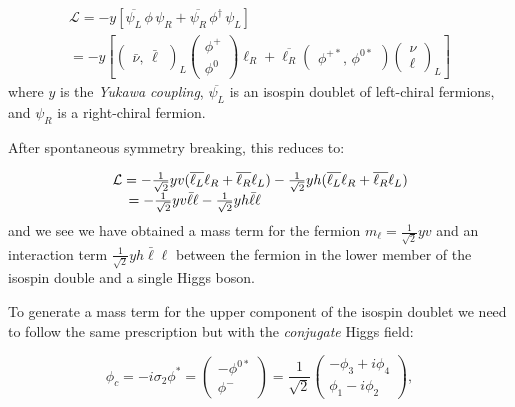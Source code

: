 \begin{equation}
\begin{array}{l}
\mathcal{L} = -y [ \overline{\psi_{L}} \, \phi \, \psi_{R} + \overline{\psi_{R}} \, \phi^{\dagger} \, \psi_{L}]\\
=  -y\left[\begin{pmatrix} \bar{\nu},\,\bar{\ell}\end{pmatrix}_{L} \begin{pmatrix} \phi^{+} \\ \phi^{0} \end{pmatrix} \ell_{R} + 
\overline{\ell_{R}} \begin{pmatrix} \phi^{+*},\,\phi^{0*} \end{pmatrix} \begin{pmatrix} \nu \\ \ell \end{pmatrix}_{L}\right]
\end{array}
\end{equation}
where $y$ is the \textit{Yukawa coupling}, $\overline{\psi_{L}}$ is an isospin doublet of left-chiral fermions, and $\psi_{R}$ is a right-chiral fermion.

After spontaneous symmetry breaking, this reduces to:

\begin{equation}
\begin{array}{l}
\mathcal{L} =
-\frac{1}{\sqrt{2}}yv (\overline{\ell_{L}}\ell_{R} + \overline{\ell_{R}}\ell_{L})
-\frac{1}{\sqrt{2}}yh (\overline{\ell_{L}}\ell_{R} + \overline{\ell_{R}}\ell_{L})\\
\hspace{4mm} = - \frac{1}{\sqrt{2}} yv \bar{\ell}\ell - \frac{1}{\sqrt{2}} y h \bar{\ell}\ell
\end{array}
\end{equation}
and we see we have obtained a mass term for the fermion $m_{\ell} = \frac{1}{\sqrt{2}} yv$ and an interaction term $\frac{1}{\sqrt{2}} y h \bar{\ell}\ell$ between the fermion in the lower member of the isospin double and a single Higgs boson.

To generate a mass term for the upper component of the isospin doublet we need to follow the same prescription but with the \textit{conjugate} Higgs field:

\begin{equation}
\phi_{c} = - i \sigma_{2} \phi^{*}
= \begin{pmatrix} -\phi^{0*} \\ \phi^{-} \end{pmatrix} = \frac{1}{\sqrt{2}} \begin{pmatrix} -\phi_{3} + i\phi_{4} \\  \phi_{1} - i \phi_{2} \end{pmatrix},
\end{equation}

